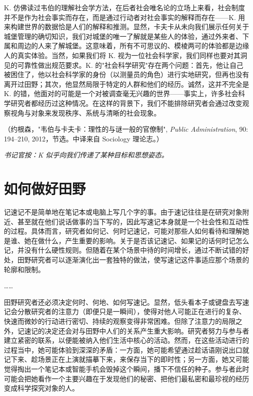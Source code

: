 \documentclass[12pt,a4paper]{article}
\newcommand{\clerknote}[1]{%
  \vspace{1.2em}%
  {\kaishu\small\textit{书记官按：#1}}%
}
\newcommand{\sourcenote}[1]{%
  \par\vspace{0.5em}%
  {\footnotesize\color{gray}（#1）}%
}
\begin{document}
K. 仿佛读过韦伯的理解社会学方法，在后者社会唯名论的立场上来看，社会制度并不是作为社会事实而存在，而是通过行动者对社会事实的解释而存在——K. 用来构建世界的数据恰是人们的解释和推测。显然，卡夫卡从未向我们展示任何关于城堡管理的确切知识，我们对城堡的唯一了解就是某些人的体验，通过外来者、下属和周边的人来了解城堡。这意味着，所有不可思议的、模棱两可的体验都是边缘人的真实体验。当然，如果我们将 K. 视为一位社会科学家，我们同样也要对其洞见的可靠性做出规范要求。K. 的"社会科学研究"存在两个问题：首先，他让自己被困住了，他以社会科学家的身份（以测量员的角色）进行实地研究，但再也没有离开过田野；其次，他显然局限于特定的人群和他们的经历。诚然，这并不完全是 K. 的错，他面对的可能是一个对被调查毫无兴趣的世界——事实上，许多社会科学研究者都经历过这种情况。在这样的背景下，我们不能排除研究者会通过改变观察视角与对象来发现秩序、系统与清晰的社会现象。
\sourcenote{约根森，"韦伯与卡夫卡：理性的与谜一般的官僚制", \textit{Public Administration}, 90: 194--210, 2012，节选。中译来自 Sociology 理论志。}

\clerknote{K 似乎向我们传递了某种目标和思想姿态。}

\newpage

\section{如何做好田野}

记速记不是简单地在笔记本或电脑上写几个字的事。由于速记往往是在研究对象附近、甚至就在他们说话做事的当下写的，因此写速记本身就是一个社会性和互动性的过程。具体而言，研究者如何记、何时记速记，可能对那些人如何看待和理解她是谁、她在做什么，产生重要的影响。关于是否该记速记、如果记的话何时记怎么记，并没有什么硬性规则。但随着在某个场景中待的时间增长，通过不断试错的好处，田野研究者可以逐渐演化出一套独特的做法，使写速记这件事适应那个场景的轮廓和限制。

……

田野研究者还必须决定何时、何地、如何写速记。显然，低头看本子或键盘去写速记会分散研究者的注意力（即便只是一瞬间），使得对他人可能正在进行的复杂、快速而微妙的行动进行密切、持续的观察变得非常困难。但除了注意力的局限之外，记速记的决定还会对与田野中人们的关系产生重大影响。研究者努力与参与者建立紧密的联系，以便能被纳入他们生活中核心的活动。然而，在这些活动进行的过程当中，她可能体验到深深的矛盾：一方面，她可能希望通过趁话语刚说出口就记下来、趁场景正在上演就描摹下来，来保存当下的即时性；另一方面，她又可能觉得掏出一个笔记本或智能手机会毁掉这个瞬间，播下不信任的种子。参与者此时可能会把她看作一个主要兴趣在于发现他们的秘密、把他们最私密和最珍视的经历变成科学探究对象的人。
\end{document}
